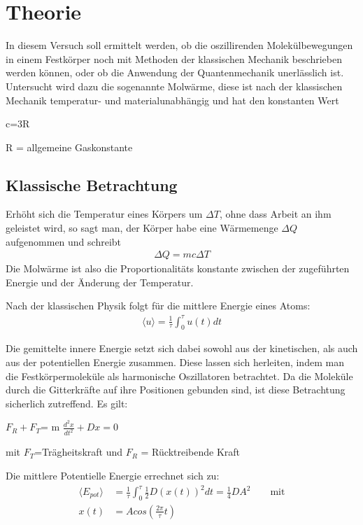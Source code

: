 
\section{Theorie}
In diesem Versuch soll ermittelt werden, ob die oszillirenden Molekülbewegungen in einem Festkörper noch mit Methoden der klassischen Mechanik beschrieben werden können, oder ob die Anwendung der Quantenmechanik unerlässlich ist. Untersucht wird dazu die sogenannte Molwärme, diese ist nach der klassischen Mechanik temperatur- und materialunabhängig und hat den konstanten Wert
\begin{formel}[H]
\centering
c=3R
\caption*{\small{R = allgemeine Gaskonstante}}
\end{formel}

\subsection{Klassische Betrachtung}
Erhöht sich die Temperatur eines Körpers um $\Delta T$, ohne dass Arbeit an ihm geleistet wird, so sagt man, der Körper habe eine Wärmemenge $\Delta Q$ aufgenommen und schreibt
\begin{align}
\Delta Q = mc \Delta T
\end{align}
Die Molwärme ist also die Proportionalitäts konstante zwischen der zugeführten Energie und der Änderung der Temperatur.

Nach der klassischen Physik folgt für die mittlere Energie eines Atoms:
\begin{align*}
\langle u\rangle = \frac{1}{\tau} \int^\tau_0 u(t) dt
\end{align*}

Die gemittelte innere Energie setzt sich dabei sowohl aus der kinetischen, als auch aus der potentiellen Energie zusammen.
Diese lassen sich herleiten, indem man die Festkörpermoleküle als harmonische Oszillatoren betrachtet. Da die Moleküle durch die Gitterkräfte auf ihre Positionen gebunden sind, ist diese Betrachtung sicherlich zutreffend. Es gilt:
\begin{formel}[H]
\centering
$F_R + F_T $= m $\frac{d^2x}{dt^2} + Dx  = 0$
\caption*{\small{mit
$F_T$=Trägheitskraft und $F_R$ = Rücktreibende Kraft}}
\end{formel}

Die mittlere Potentielle Energie errechnet sich zu:
\begin{align*}
\langle E_{pot}\rangle &= \frac{1}{\tau} \int^\tau_0 \frac{1}{2} D \left( x(t) \right)^2 dt =  \frac{1}{4} D A^2 \qquad \text{mit}\\
x(t)&=Acos\left(\frac{2\pi}{\tau}t\right)
\end{align*}


